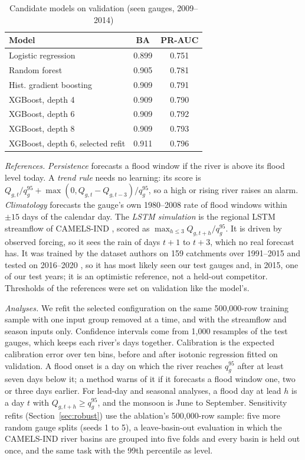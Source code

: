 \documentclass[conference]{IEEEtran}
\begin{document}
\begin{table}[t]
\caption{Candidate models on validation (seen gauges, 2009--2014)}
\label{tab:cand}
\centering
\footnotesize
\begin{tabular}{lcc}
\toprule
Model & BA & PR-AUC\\
\midrule
Logistic regression & 0.899 & 0.751\\
Random forest & 0.905 & 0.781\\
Hist. gradient boosting & 0.909 & 0.791\\
XGBoost, depth 4 & 0.909 & 0.790\\
XGBoost, depth 6 & 0.909 & 0.792\\
XGBoost, depth 8 & 0.909 & 0.793\\
XGBoost, depth 6, selected refit & 0.911 & 0.796\\
\bottomrule
\end{tabular}
\end{table}

\textit{References.} \emph{Persistence} forecasts a flood window if the river is above its flood level today. A \emph{trend rule} needs no learning: its score is $Q_{g,t}/q^{95}_g+\max(0,Q_{g,t}-Q_{g,t-3})/q^{95}_g$, so a high or rising river raises an alarm. \emph{Climatology} forecasts the gauge's own 1980--2008 rate of flood windows within $\pm15$ days of the calendar day. The \emph{LSTM simulation} is the regional LSTM streamflow of CAMELS-IND \cite{Mangukiya2025}, scored as $\max_{h\le3}\hat Q_{g,t+h}/q^{95}_g$. It is driven by observed forcing, so it sees the rain of days $t{+}1$ to $t{+}3$, which no real forecast has. It was trained by the dataset authors on 159 catchments over 1991--2015 and tested on 2016--2020 \cite{Mangukiya2025}, so it has most likely seen our test gauges and, in 2015, one of our test years; it is an optimistic reference, not a held-out competitor. Thresholds of the references were set on validation like the model's.

\textit{Analyses.} We refit the selected configuration on the same 500,000-row training sample with one input group removed at a time, and with the streamflow and season inputs only. Confidence intervals come from 1,000 resamples of the test gauges, which keeps each river's days together. Calibration is the expected calibration error over ten bins, before and after isotonic regression fitted on validation. A flood onset is a day on which the river reaches $q^{95}_g$ after at least seven days below it; a method warns of it if it forecasts a flood window one, two or three days earlier. For lead-day and seasonal analyses, a flood day at lead $h$ is a day $t$ with $Q_{g,t+h}\ge q^{95}_g$, and the monsoon is June to September. Sensitivity refits (Section~\ref{sec:robust}) use the ablation's 500,000-row sample: five more random gauge splits (seeds 1 to 5), a leave-basin-out evaluation in which the CAMELS-IND river basins are grouped into five folds and every basin is held out once, and the same task with the 99th percentile as level.
\end{document}
